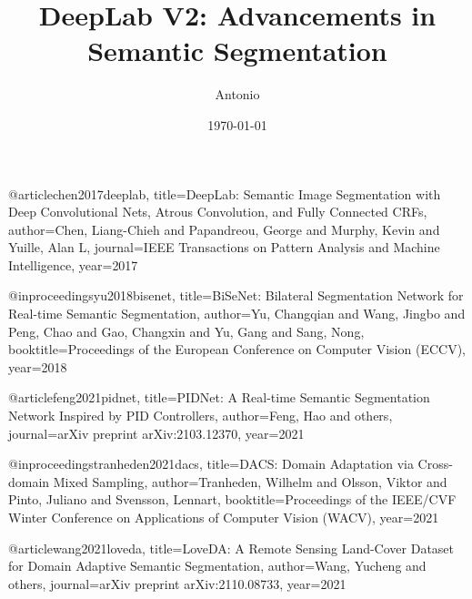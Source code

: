 \documentclass[a4paper,12pt]{article}
\begin{document}


@article{chen2017deeplab,
  title={DeepLab: Semantic Image Segmentation with Deep Convolutional Nets, Atrous Convolution, and Fully Connected CRFs},
  author={Chen, Liang-Chieh and Papandreou, George and Murphy, Kevin and Yuille, Alan L},
  journal={IEEE Transactions on Pattern Analysis and Machine Intelligence},
  year={2017}
}

@inproceedings{yu2018bisenet,
  title={BiSeNet: Bilateral Segmentation Network for Real-time Semantic Segmentation},
  author={Yu, Changqian and Wang, Jingbo and Peng, Chao and Gao, Changxin and Yu, Gang and Sang, Nong},
  booktitle={Proceedings of the European Conference on Computer Vision (ECCV)},
  year={2018}
}

@article{feng2021pidnet,
  title={PIDNet: A Real-time Semantic Segmentation Network Inspired by PID Controllers},
  author={Feng, Hao and others},
  journal={arXiv preprint arXiv:2103.12370},
  year={2021}
}

@inproceedings{tranheden2021dacs,
  title={DACS: Domain Adaptation via Cross-domain Mixed Sampling},
  author={Tranheden, Wilhelm and Olsson, Viktor and Pinto, Juliano and Svensson, Lennart},
  booktitle={Proceedings of the IEEE/CVF Winter Conference on Applications of Computer Vision (WACV)},
  year={2021}
}

@article{wang2021loveda,
  title={LoveDA: A Remote Sensing Land-Cover Dataset for Domain Adaptive Semantic Segmentation},
  author={Wang, Yucheng and others},
  journal={arXiv preprint arXiv:2110.08733},
  year={2021}
}



\title{DeepLab V2: Advancements in Semantic Segmentation}
\author{Antonio}
\date{\today}
\end{document}
